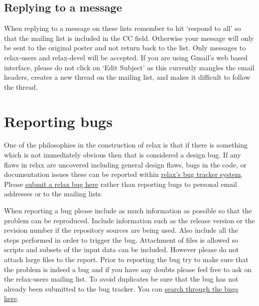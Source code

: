 \subsection{Replying to a message}

When replying to a message on these lists remember to hit `respond to all' so that the mailing list is included in the CC field.
Otherwise your message will only be sent to the original poster and not return back to the list.
Only messages to relax-users and relax-devel will be accepted.
If you are using Gmail's web based interface, please do not click on `Edit Subject' as this currently mangles the email headers, creates a new thread on the mailing list, and makes it difficult to follow the thread.




\section{Reporting bugs}\label{reporting bugs}

One of the philosophies in the construction of relax is that if there is something which is not immediately obvious then that is considered a design bug.
If any flaws in relax are uncovered including general design flaws, bugs in the code, or documentation issues these can be reported within \href{\relaxBugTrackerURL}{relax's bug tracker system}.
Please \href{\relaxBugTrackerSubmitURL}{submit a relax bug here} rather than reporting bugs to personal email addresses or to the mailing lists.

When reporting a bug please include as much information as possible so that the problem can be reproduced.
Include information such as the release version or the revision number if the repository sources are being used.
Also include all the steps performed in order to trigger the bug.
Attachment of files is allowed so scripts and subsets of the input data can be included.
However please do not attach large files to the report.
Prior to reporting the bug try to make sure that the problem is indeed a bug and if you have any doubts please feel free to ask on the relax-users mailing list.
To avoid duplicates be sure that the bug has not already been submitted to the bug tracker.
You can \href{\relaxBugTrackerSearchURL}{search through the bugs here}.

